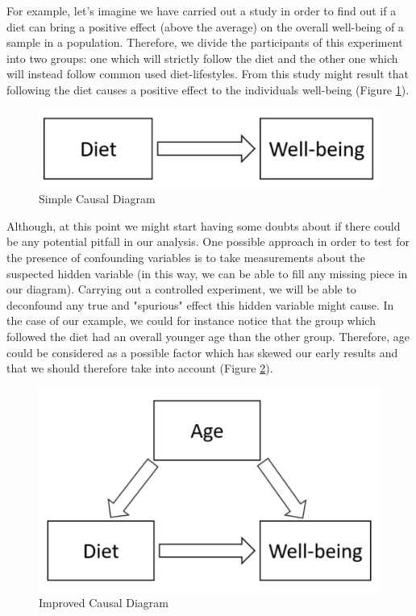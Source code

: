 For example, let's imagine we have carried out a study in order to find out if a diet can bring a positive effect (above the average) on the overall well-being of a sample in a population. Therefore, we divide the participants of this experiment into two groups: one which will strictly follow the diet and the other one which will instead follow common used diet-lifestyles. From this study might result that following the diet causes a positive effect to the individuals well-being (Figure \ref{cex1}).

\begin{figure}[ht!]%
    \centering
    \includegraphics[width=0.4\linewidth]{latex/images/simple_ex.pdf}
    \vspace{-0.2cm}
    \caption{Simple Causal Diagram}
    \label{cex1}
\end{figure}
\vspace{-0.5cm}

Although, at this point we might start having some doubts about if there could be any potential pitfall in our analysis. One possible approach in order to test for the presence of confounding variables is to take measurements about the suspected hidden variable (in this way, we can be able to fill any missing piece in our diagram). Carrying out a controlled experiment, we will be able to deconfound any true and "spurious" effect this hidden variable might cause. In the case of our example, we could for instance notice that the group which followed the diet had an overall younger age than the other group. Therefore, age could be considered as a possible factor which has skewed our early results and that we should therefore take into account (Figure \ref{cex2}).  

\begin{figure}[ht!]%
    \centering
    \includegraphics[width=0.4\linewidth]{latex/images/simple_ex2.pdf}
    \vspace{-0.2cm}
    \caption{Improved Causal Diagram}
    \label{cex2}
\end{figure}
\vspace{-0.5cm}

